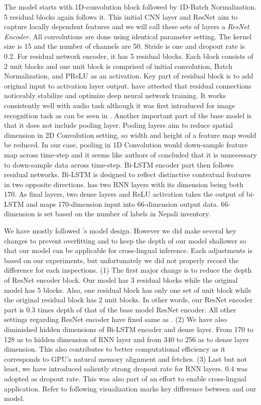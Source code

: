 \documentclass[11pt]{article}
\begin{document}
{The model starts with 1D-convolution block followed by 1D-Batch Normalization. 5 residual blocks again follows it. This initial CNN layer and ResNet aim to capture locally dependent features and we will call these sets of layers a \emph{ResNet Encoder}. All convolutions are done using identical parameter setting. The kernel size is 15 and the number of channels are 50. Stride is one and dropout rate is 0.2. For residual network encoder, it has 5 residual blocks. Each block consists of 2 unit blocks and one unit block is comprised of initial convolution, Batch Normalization, and PReLU as an activation. Key part of residual block is to add original input to activation layer output. \cite{ravanelli2019speakerrecognitionrawwaveform} have attested that residual connections noticeably stabilize and optimize deep neural network training. It works consistently well with audio task although it was first introduced for image recognition task as can be seen in \cite{dhakal2022automatic}. Another important part of the base model is that it does not include pooling layer. Pooling layers aim to reduce spatial dimension in 2D Convolution setting, so width and height of a feature map would be reduced. In our case, pooling in 1D Convolution would down-sample feature map across time-step and it seems like authors of \cite{dhakal2022automatic} concluded that it is unnecessary to down-sample data across time-step. Bi-LSTM encoder part then follows residual networks. Bi-LSTM is designed to reflect distinctive contextual features in two opposite directions. \cite{dhakal2022automatic} has two RNN layers with its dimension being both 170. As final layers, two dense layers and ReLU activation takes the output of bi-LSTM and maps 170-dimension input into 66-dimension output data. 66-dimension is set based on the number of labels in Nepali inventory.

We have mostly followed \cite{dhakal2022automatic}'s model design. However we did make several key changes to prevent overfitting and to keep the depth of our model shallower so that our model can be applicable for cross-lingual inference. Each adjustments is based on our experiments, but unfortunately we did not properly record the difference for each inspections. (1) The first major change is to reduce the depth of ResNet encoder block. Our model has 3 residual blocks while the original model has 5 blocks. Also, one residual block has only one set of unit block while the original residual block has 2 unit blocks. In other words, our ResNet encoder part is 0.3 times depth of that of the base model ResNet encoder. All other settings regarding ResNet encoder have fixed same as \cite{dhakal2022automatic}. (2) We have also diminished hidden dimensions of Bi-LSTM encoder and dense layer. From 170 to 128 as to hidden dimension of RNN layer and from 340 to 256 as to dense layer dimension. This also contributes to better computational efficiency as it corresponds to GPU's natural memory alignment and fetches. (3) Last but not least, we have introduced saliently strong dropout rate for RNN layers. 0.4 was adopted as dropout rate. This was also part of an effort to enable cross-lingual application. Refer to following visualization marks key difference between \cite{dhakal2022automatic} and our model.

}
\end{document}

